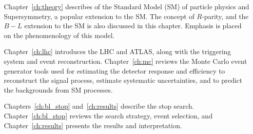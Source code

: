 Chapter~\ref{ch:theory} describes of the Standard Model (SM) of
particle physics and Supersymmetry, a popular extension to the SM.
The concept of $R$-parity, and the $B-L$ extension to the SM is also discussed
in this chapter.
Emphasis is placed on the phenomenology of this model.

Chapter~\ref{ch:lhc} introduces the LHC and ATLAS, along with the triggering
system and event reconstruction.
Chapter~\ref{ch:mc} reviews the Monte Carlo event generator tools used for
estimating the detector response and efficiency to reconstruct the signal
process, estimate systematic uncertainties, and to predict the backgrounds
from SM processes.

Chapters~\ref{ch:bl_stop} and~\ref{ch:results} describe the stop search.
Chapter~\ref{ch:bl_stop} reviews the search strategy, event selection, and
Chapter~\ref{ch:results} presents the results and interpretation.
